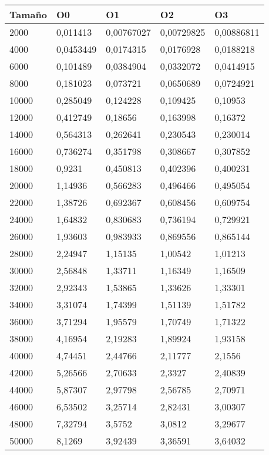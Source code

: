 \begin{tabular}{|l|l|l|l|l|}
	\hline
	Tamaño & O0 & O1 & O2 & O3 \\
	\hline
	\hline
	2000 & 0,011413 & 0,00767027 & 0,00729825 & 0,00886811 \\
	\hline
	4000 & 0,0453449 & 0,0174315 & 0,0176928 & 0,0188218 \\
	\hline
	6000 & 0,101489 & 0,0384904 & 0,0332072 & 0,0414915 \\
	\hline
	8000 & 0,181023 & 0,073721 & 0,0650689 & 0,0724921 \\
	\hline
	10000 & 0,285049 & 0,124228 & 0,109425 & 0,10953 \\
	\hline
	12000 & 0,412749 & 0,18656 & 0,163998 & 0,16372 \\
	\hline
	14000 & 0,564313 & 0,262641 & 0,230543 & 0,230014 \\
	\hline
	16000 & 0,736274 & 0,351798 & 0,308667 & 0,307852 \\
	\hline
	18000 & 0,9231 & 0,450813 & 0,402396 & 0,400231 \\
	\hline
	20000 & 1,14936 & 0,566283 & 0,496466 & 0,495054 \\
	\hline
	22000 & 1,38726 & 0,692367 & 0,608456 & 0,609754 \\
	\hline
	24000 & 1,64832 & 0,830683 & 0,736194 & 0,729921 \\
	\hline
	26000 & 1,93603 & 0,983933 & 0,869556 & 0,865144 \\
	\hline
	28000 & 2,24947 & 1,15135 & 1,00542 & 1,01213 \\
	\hline
	30000 & 2,56848 & 1,33711 & 1,16349 & 1,16509 \\
	\hline
	32000 & 2,92343 & 1,53865 & 1,33626 & 1,33301 \\
	\hline
	34000 & 3,31074 & 1,74399 & 1,51139 & 1,51782 \\
	\hline
	36000 & 3,71294 & 1,95579 & 1,70749 & 1,71322 \\
	\hline
	38000 & 4,16954 & 2,19283 & 1,89924 & 1,93158 \\
	\hline
	40000 & 4,74451 & 2,44766 & 2,11777 & 2,1556 \\
	\hline
	42000 & 5,26566 & 2,70633 & 2,3327 & 2,40839 \\
	\hline
	44000 & 5,87307 & 2,97798 & 2,56785 & 2,70971 \\
	\hline
	46000 & 6,53502 & 3,25714 & 2,82431 & 3,00307 \\
	\hline
	48000 & 7,32794 & 3,5752 & 3,0812 & 3,29677 \\
	\hline
	50000 & 8,1269 & 3,92439 & 3,36591 & 3,64032 \\
	\hline
\end{tabular}

